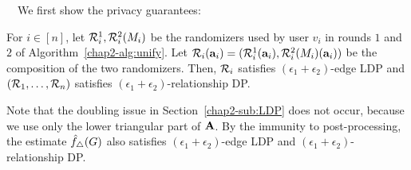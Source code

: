 \smallskip
{}~~We first show the privacy guarantees:
\begin{theorem}\label{chap2-thm:privacy_algorithms}
  For $i \in [n]$,
  let
  $\mathcal{R}_i^1, \mathcal{R}_i^2(M_i)$
  be the randomizers used by user $v_i$ in
  rounds $1$ and $2$ of Algorithm~\ref{chap2-alg:unify}. %
  Let
  $\mathcal{R}_i(\mathbf{a}_i) = (\mathcal{R}_i^1(\mathbf{a}_i), \mathcal{R}_i^2(M_i)(\mathbf{a}_i))$
  be the composition of the two randomizers. Then,
  $\mathcal{R}_i$
  satisfies
  $(\epsilon_1+\epsilon_2)$-edge LDP and
  $(\mathcal{R}_1,
  \ldots, \mathcal{R}_n)$ satisfies  $(\epsilon_1+\epsilon_2)$-relationship DP.
\end{theorem}

Note that the doubling issue in Section~\ref{chap2-sub:LDP} does not occur, 
because we use only the lower triangular part of $\mathbf{A}$. 
By the immunity to post-processing, the estimate  $\hat{f}_\triangle(G)$
also satisfies $(\epsilon_1+\epsilon_2)$-edge LDP and $(\epsilon_1+\epsilon_2)$-relationship DP.

